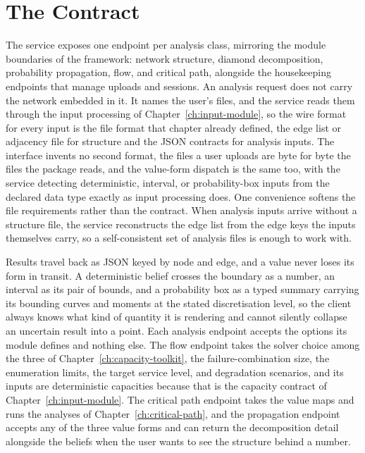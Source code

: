 \documentclass[12pt]{report}
\begin{document}
\section{The Contract}
\label{sec:fe-contract}

The service exposes one endpoint per analysis class, mirroring the module boundaries of the framework: network structure, diamond decomposition, probability propagation, flow, and critical path, alongside the housekeeping endpoints that manage uploads and sessions. An analysis request does not carry the network embedded in it. It names the user's files, and the service reads them through the input processing of Chapter~\ref{ch:input-module}, so the wire format for every input is the file format that chapter already defined, the edge list or adjacency file for structure and the JSON contracts for analysis inputs. The interface invents no second format, the files a user uploads are byte for byte the files the package reads, and the value-form dispatch is the same too, with the service detecting deterministic, interval, or probability-box inputs from the declared data type exactly as input processing does. One convenience softens the file requirements rather than the contract. When analysis inputs arrive without a structure file, the service reconstructs the edge list from the edge keys the inputs themselves carry, so a self-consistent set of analysis files is enough to work with.

Results travel back as JSON keyed by node and edge, and a value never loses its form in transit. A deterministic belief crosses the boundary as a number, an interval as its pair of bounds, and a probability box as a typed summary carrying its bounding curves and moments at the stated discretisation level, so the client always knows what kind of quantity it is rendering and cannot silently collapse an uncertain result into a point. Each analysis endpoint accepts the options its module defines and nothing else. The flow endpoint takes the solver choice among the three of Chapter~\ref{ch:capacity-toolkit}, the failure-combination size, the enumeration limits, the target service level, and degradation scenarios, and its inputs are deterministic capacities because that is the capacity contract of Chapter~\ref{ch:input-module}. The critical path endpoint takes the value maps and runs the analyses of Chapter~\ref{ch:critical-path}, and the propagation endpoint accepts any of the three value forms and can return the decomposition detail alongside the beliefs when the user wants to see the structure behind a number.
\end{document}
